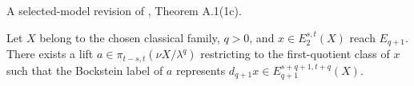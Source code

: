 \begin{theorem}
\label{frontier:Literature:98ed1948c077}
A selected-model revision of \cite{BHS}, Theorem A.1(1c).\par

Let $X$ belong to the chosen classical family, $q>0$, and $x\in E_2^{s,t}(X)$ reach $E_{q+1}$. There exists a lift $a\in\pi_{t-s,t}(\nu X/\lambda^q)$ restricting to the first-quotient class of $x$ such that the Bockstein label of $a$ represents $d_{q+1}x\in E_{q+1}^{s+q+1,t+q}(X)$.
\end{theorem}



